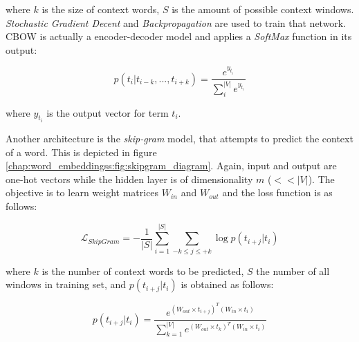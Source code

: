\noindent
where $k$ is the size of context words, $S$ is the amount of possible context windows. \textit{Stochastic Gradient Decent} and \textit{Backpropagation} are used to train that network. CBOW is actually a encoder-decoder model and applies a \textit{SoftMax} function in its output: 

\begin{equation} \label{chap:word_embeddings:eq:CBOW_softmax}
	p(t_{i}|t_{i-k},...,t_{i+k}) = \frac{e^{y_{t_{i}}}}{\sum^{|V|}_{i}{e^{y_{t_i}}}}
\end{equation}

\nointdent where $y_{t_i}$ is the output vector for term $t_i$.

Another architecture is the \textit{skip-gram} model, that attempts to predict the context of a word. This is depicted in figure \ref{chap:word_embeddingss:fig:skipgram_diagram}. Again, input and output are one-hot vectors while the hidden layer is of dimensionality $m$ ($<<|V|$). The objective is to learn weight matrices $W_{in}$ and $W_{out}$ and the loss function is as follows:

\begin{equation} \label{chap:word_embeddings:eq:skipgram_log_likelihood}
	 \mathcal{L}_{SkipGram} = -\frac{1}{|S|} \sum_{i=1}^{|S|}{ \sum_{-k \leq j \leq +k}{ \log {p(t_{i+j}|t_{i})}  } }
\end{equation}

\nointend where $k$ is the number of context words to be predicted, $S$ the number of all windows in training set, and $p(t_{i+j}|t_{i})$ is obtained as follows:

\begin{equation} \label{chap:word_embeddings:eq:skipgram_softmax}
	p(t_{i+j}|t_{i}) = \frac{ e^{(W_{out}  \times  t_{i+j})^{T} (W_{in} \times  t_{i})}}{\sum^{|V|}_{k=1}{ e^{(W_{out}  \times  t_{k})^{T} (W_{in} \times  t_{i})}}} 
\end{equation}

